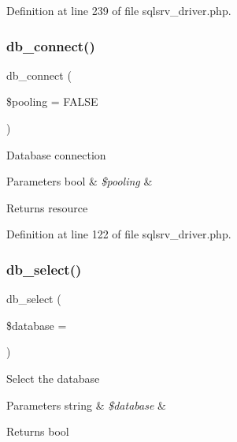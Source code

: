 Definition at line 239 of file sqlsrv\+\_\+driver.\+php.

\mbox{\label{class_c_i___d_b__sqlsrv__driver_a6d26c8c9642181bd1124a45342f669f7}} 
\subsubsection{\texorpdfstring{db\_connect()}{db\_connect()}}
{\footnotesize\ttfamily db\+\_\+connect (\begin{DoxyParamCaption}\item[{}]{\$pooling = {\ttfamily FALSE} }\end{DoxyParamCaption})}

Database connection


\begin{DoxyParams}[1]{Parameters}
bool & {\em \$pooling} & \\
\hline
\end{DoxyParams}
\begin{DoxyReturn}{Returns}
resource 
\end{DoxyReturn}


Definition at line 122 of file sqlsrv\+\_\+driver.\+php.

\mbox{\label{class_c_i___d_b__sqlsrv__driver_a18ae9c21870b30b45337c5e3626190cc}} 
\subsubsection{\texorpdfstring{db\_select()}{db\_select()}}
{\footnotesize\ttfamily db\+\_\+select (\begin{DoxyParamCaption}\item[{}]{\$database = {\ttfamily \textquotesingle{}\textquotesingle{}} }\end{DoxyParamCaption})}

Select the database


\begin{DoxyParams}[1]{Parameters}
string & {\em \$database} & \\
\hline
\end{DoxyParams}
\begin{DoxyReturn}{Returns}
bool 
\end{DoxyReturn}


